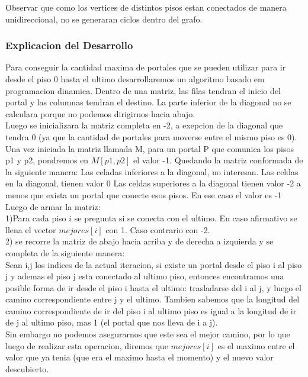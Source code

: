 
Observar que como los vertices de distintos pisos estan conectados de manera unidireccional, no se generaran ciclos dentro del grafo.

\subsubsection{Explicacion del Desarrollo}
Para conseguir la cantidad maxima de portales que se pueden utilizar para ir desde el piso 0 hasta el ultimo desarrollaremos un algoritmo basado em programacion dinamica. Dentro de una matriz, las filas tendran el inicio del portal y las columnas tendran el destino. La parte inferior de la diagonal no se calculara porque no podemos dirigirnos hacia abajo.\\
Luego se inicializara la matriz completa en -2, a exepcion de la diagonal que tendra 0 (ya que la cantidad de portales para moverse entre el mismo piso es 0). Una vez iniciada la matriz llamada M, para un portal P que comunica los pisos p1 y p2, pondremos en $M[p1,p2]$ el valor -1. Quedando la matriz conformada de la siguiente manera:
\subitem
Las celadas inferiores a la diagonal, no interesan.
\subitem
Las celdas en la diagonal, tienen valor 0
\subitem
Las celdas superiores a la diagonal tienen valor -2 a menos que exista un portal que conecte esos pisos. En ese caso el valor es -1 \\

Luego de armar la matriz: \\
1)Para cada piso $i$ se pregunta si se conecta con el ultimo. En caso afirmativo se llena el vector $mejores[i]$ con 1. Caso contrario con -2.\\

2) se recorre la matriz de abajo hacia arriba y de derecha a izquierda y se completa de la siguiente manera: \\

Sean i,j los indices de la actual iteracion, si existe un portal desde el piso i al piso j y ademas el piso j esta conectado al ultimo piso, entonces encontramos una posible forma de ir desde el piso i hasta el ultimo: trasladarse del i al j, y luego el camino correspondiente entre j y el ultimo. Tambien sabemos que la longitud del camino correspondiente de ir del piso i al ultimo piso es igual a la longitud de ir de j al ultimo piso, mas 1 (el portal que nos lleva de i a j).\\
Sin embargo no podemos asegurarnos que este sea el mejor camino, por lo que luego de realizar esta operacion, diremos que $mejores[i]$ es el maximo entre el valor que ya tenia (que era el maximo hasta el momento) y el nuevo valor descubierto. 

